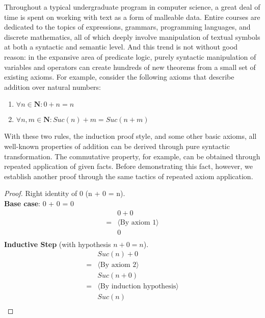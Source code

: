 \documentclass{article}
\begin{document}
Throughout a typical undergraduate program in computer science, a great deal of time is spent on working with text as a form of malleable data.
Entire courses are dedicated to the topics of expressions, grammars, programming languages, and discrete mathematics, all of which
deeply involve manipulation of textual symbols at both a syntactic and semantic level.
And this trend is not without good reason: in the expansive area of predicate logic,
purely syntactic manipulation of variables and operators can create hundreds of new theorems from a small set of existing axioms.
For example, consider the following axioms that describe addition over natural numbers:
\begin{enumerate}
    \item $\forall n \in \mathbf{N}: 0 + n = n$
    \item $\forall n,m \in \mathbf{N}: Suc(n) + m = Suc(n + m)$
\end{enumerate}
With these two rules, the induction proof style, and some other basic axioms,
all well-known properties of addition can be derived through pure syntactic transformation.
The commutative property, for example, can be obtained through repeated application of given facts.
Before demonstrating this fact, however, we establish another proof through the same tactics of repeated axiom application.
\begin{proof}
    Right identity of 0 (n + 0 = n).
    \\
    \textbf{Base case}: 0 + 0 = 0
    \begin{align*}
        &0 + 0\\
        = &\langle \text{By axiom 1} \rangle \\
        &0\\
    \end{align*}
    \textbf{Inductive Step} (with hypothesis $n + 0 = n$).
    \begin{align*}
        &Suc(n) + 0\\
        = &\langle \text{By axiom 2} \rangle \\
        &Suc(n + 0)\\
        = &\langle \text{By induction hypothesis} \rangle \\
        &Suc(n)\\
    \end{align*}
\end{proof}
\end{document}
